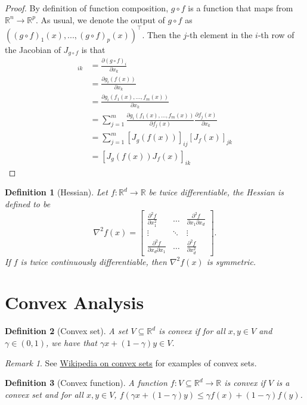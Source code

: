 \documentclass{article}
\newtheorem{definition}{Definition}
\newcommand{\R}{\mathbb{R}}
\DeclareMathOperator*{\1}{\mathbbm{1}}
\theoremstyle{definition}
\theoremstyle{remark}
\newtheorem{remark}{Remark}
\begin{document}
  \begin{proof}
    By definition of function composition, $g\circ f$ is a function that maps from $\R^n\to\R^p$. As usual, we denote the output of $g\circ f$ as $((g\circ f)_1(x),...,(g\circ f)_p(x))^\top$. Then the $j$-th element in the $i$-th row of the Jacobian of $J_{g\circ f}$ is that
    \begin{align*}
        [J_{g\circ f}(x)]_{ik}&=\frac{\partial (g\circ f)_i}{\partial x_k}\\
        &=\frac{\partial g_i(f(x))}{\partial x_k}\\
        &=\frac{\partial g_i(f_1(x),...,f_m(x))}{\partial x_k}\\
        &=\sum_{j=1}^m \frac{\partial g_i(f_1(x),...,f_m(x))}{\partial f_j(x)}\frac{\partial f_j(x)}{\partial x_k}\tag{Chain rule}\\
        &=\sum_{j=1}^m [J_g(f(x))]_{ij}[J_f(x)]_{jk}\\
        &=[J_g(f(x))J_f(x)]_{ik}
    \end{align*}
  \end{proof}
  \begin{definition}[Hessian]
    Let $f:\R^d\to\R$ be twice differentiable, the Hessian is defined to be
    \begin{equation*}
        \nabla^2 f(x)=\begin{bmatrix}
            \frac{\partial^2 f}{\partial x_1^2}&\dotsc &\frac{\partial^2 f}{\partial x_1\partial x_d}\\
            \vdots&\ddots& \vdots\\
            \frac{\partial^2 f}{\partial x_d\partial x_1}&\dotsc&\frac{\partial^2 f}{\partial x_d^2}
        \end{bmatrix}.
    \end{equation*}
    If $f$ is twice continuously differentiable, then $\nabla^2f(x)$ is symmetric.
  \end{definition}
  \section{Convex Analysis}
  \begin{definition}[Convex set]
    A set $V\subseteq \R^d$ is convex if for all $x,y\in V$ and $\gamma \in (0,1)$, we have that $\gamma x + (1-\gamma) y \in V$.
  \end{definition}
  \begin{remark}
    See \href{https://en.wikipedia.org/wiki/Convex_set}{Wikipedia on convex sets} for examples of convex sets.
  \end{remark}
  \begin{definition}[Convex function]
    A function $f:V\subseteq \R^d\to\R$ is convex if $V$ is a convex set and for all $x,y\in V$, $f(\gamma x+ (1-\gamma) y)\le \gamma f(x)+(1-\gamma)f(y)$.
  \end{definition}
\end{document}
